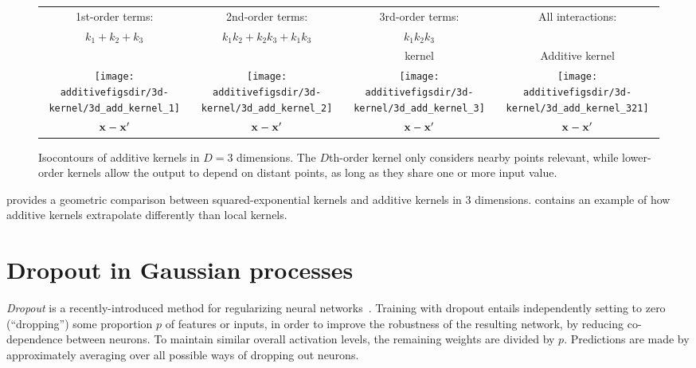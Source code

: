\begin{figure}[h!]
\centering
\renewcommand{\tabcolsep}{0pt}
\begin{tabular}{cccc}
1st-order terms: & 2nd-order terms: &  3rd-order terms: & All interactions: \\
$k_1 + k_2 + k_3$ & $k_1k_2 + k_2k_3 + k_1k_3$ & $k_1k_2k_3$ & \\
& & \seard{} kernel & Additive kernel\\
\texttt{[image: \\additivefigsdir/3d-kernel/3d\_add\_kernel\_1]} &
\texttt{[image: \\additivefigsdir/3d-kernel/3d\_add\_kernel\_2]} &
\texttt{[image: \\additivefigsdir/3d-kernel/3d\_add\_kernel\_3]} & 
\texttt{[image: \\additivefigsdir/3d-kernel/3d\_add\_kernel\_321]}\\
${\bf{x}} - {\bf{x}}'$ & ${\bf{x}} - {\bf{x}}'$ & ${\bf{x}} - {\bf{x}}'$ & ${\bf{x}} - {\bf{x}}'$\\[0.5em]
\end{tabular}
\caption[Isocontours of additive kernels in 3 dimensions]
{Isocontours of additive kernels in $D = 3$ dimensions.
The $D$th-order kernel only considers nearby points relevant, while lower-order kernels allow the output to depend on distant points, as long as they share one or more input value.}
\label{fig:kernels3d}
\end{figure}


 provides a geometric comparison between squared-exponential kernels and additive kernels in 3 dimensions.
 contains an example of how additive kernels extrapolate differently than local kernels.




\section{Dropout in Gaussian processes}
\label{sec:dropout-gps}

\emph{Dropout} is a recently-introduced method for regularizing neural networks~\citep{hinton2012improving, srivastava2013improving}.
Training with dropout entails independently setting to zero (``dropping'') some proportion $p$ of features or inputs, in order to improve the robustness of the resulting network, by reducing co-dependence between neurons.
To maintain similar overall activation levels, the remaining weights are divided by $p$.
Predictions are made by approximately averaging over all possible ways of dropping out neurons.

